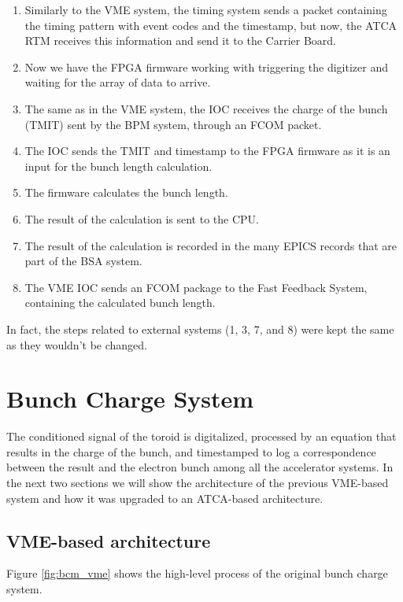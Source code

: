 \documentclass[letter,
               biblatex,     %
               keeplastbox,   %
               ]{jacow}
\begin{document}
\begin{enumerate}
   \item Similarly to the VME system, the timing system sends a packet containing the timing pattern with event codes and the timestamp, but now, the ATCA RTM receives this information and send it to the Carrier Board.
   \item Now we have the FPGA firmware working with triggering the digitizer and waiting for the array of data to arrive.
   \item The same as in the VME system, the IOC receives the charge of the bunch (TMIT) sent by the BPM system, through an FCOM packet.
   \item The IOC sends the TMIT and timestamp to the FPGA firmware as it is an input for the bunch length calculation.
   \item The firmware calculates the bunch length.
   \item The result of the calculation is sent to the CPU.
   \item The result of the calculation is recorded in the many EPICS records that are part of the BSA system.
   \item The VME IOC sends an FCOM package to the Fast Feedback System, containing the calculated bunch length.
\end{enumerate}

In fact, the steps related to external systems (1, 3, 7, and 8) were kept the same as they wouldn't be changed.

\section{Bunch Charge System}
The conditioned signal of the toroid is digitalized, processed by an equation that results in the charge of the bunch, and timestamped to log a correspondence between the result and the electron bunch among all the accelerator systems. In the next two sections we will show the architecture of the previous VME-based system and how it was upgraded to an ATCA-based architecture.

\subsection{VME-based architecture}
Figure \ref{fig:bcm_vme} shows the high-level process of the original bunch charge system.
\end{document}
